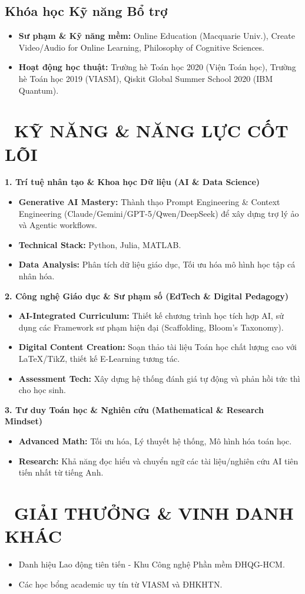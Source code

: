 \documentclass[11pt,a4paper]{article}
\begin{document}
\subsection*{Khóa học Kỹ năng Bổ trợ}
\begin{itemize}
    \item \textbf{Sư phạm \& Kỹ năng mềm:} Online Education (Macquarie Univ.), Create Video/Audio for Online Learning, Philosophy of Cognitive Sciences.
    \item \textbf{Hoạt động học thuật:} Trường hè Toán học 2020 (Viện Toán học), Trường hè Toán học 2019 (VIASM), Qiskit Global Summer School 2020 (IBM Quantum).
\end{itemize}

\section{\faTools~KỸ NĂNG \& NĂNG LỰC CỐT LÕI}

\textbf{1. Trí tuệ nhân tạo \& Khoa học Dữ liệu (AI \& Data Science)}
\begin{itemize}
    \item \textbf{Generative AI Mastery:} Thành thạo Prompt Engineering \& Context Engineering (Claude/Gemini/GPT-5/Qwen/DeepSeek) để xây dựng trợ lý ảo và Agentic workflows.
    \item \textbf{Technical Stack:} Python, Julia, MATLAB.
    \item \textbf{Data Analysis:} Phân tích dữ liệu giáo dục, Tối ưu hóa mô hình học tập cá nhân hóa.
\end{itemize}

\textbf{2. Công nghệ Giáo dục \& Sư phạm số (EdTech \& Digital Pedagogy)}
\begin{itemize}
    \item \textbf{AI-Integrated Curriculum:} Thiết kế chương trình học tích hợp AI, sử dụng các Framework sư phạm hiện đại (Scaffolding, Bloom's Taxonomy).
    \item \textbf{Digital Content Creation:} Soạn thảo tài liệu Toán học chất lượng cao với LaTeX/TikZ, thiết kế E-Learning tương tác.
    \item \textbf{Assessment Tech:} Xây dựng hệ thống đánh giá tự động và phản hồi tức thì cho học sinh.
\end{itemize}

\textbf{3. Tư duy Toán học \& Nghiên cứu (Mathematical \& Research Mindset)}
\begin{itemize}
    \item \textbf{Advanced Math:} Tối ưu hóa, Lý thuyết hệ thống, Mô hình hóa toán học.
    \item \textbf{Research:} Khả năng đọc hiểu và chuyển ngữ các tài liệu/nghiên cứu AI tiên tiến nhất từ tiếng Anh.
\end{itemize}

\section{\faTrophy~GIẢI THƯỞNG \& VINH DANH KHÁC}
\begin{itemize}
    \item Danh hiệu Lao động tiên tiến - Khu Công nghệ Phần mềm ĐHQG-HCM.
    \item Các học bổng academic uy tín từ VIASM và ĐHKHTN.
\end{itemize}
\end{document}
